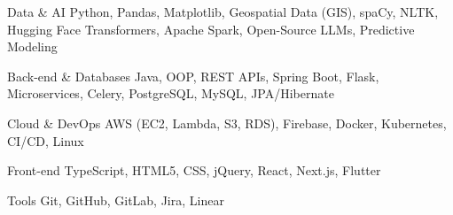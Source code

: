 

\begin{cvskills}

  \cvskill
    {Data \& AI} %
    {Python, Pandas, Matplotlib, Geospatial Data (GIS), spaCy, NLTK, Hugging Face Transformers, Apache Spark, Open-Source LLMs, Predictive Modeling} %

  \cvskill
    {Back-end \& Databases} %
    {Java, OOP, REST APIs, Spring Boot, Flask, Microservices, Celery, PostgreSQL, MySQL, JPA/Hibernate} %

  \cvskill
    {Cloud \& DevOps} %
    {AWS (EC2, Lambda, S3, RDS), Firebase, Docker, Kubernetes, CI/CD, Linux} %

  \cvskill
    {Front-end} %
    {TypeScript, HTML5, CSS, jQuery, React, Next.js, Flutter} %

  \cvskill
    {Tools } %
    {Git, GitHub, GitLab, Jira, Linear} %

\end{cvskills}